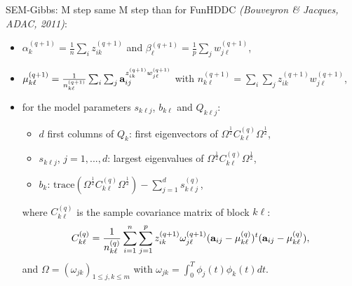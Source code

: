 \documentclass[10pt]{beamer}
\newcommand{\ba}{\bold{a}}
\begin{document}
\begin{frame}{SEM-Gibbs: M step}
same M step than for FunHDDC \textit{(Bouveyron \& Jacques, ADAC, 2011)}:
\begin{itemize}
\item $\alpha_{k}^{(q+1)}=\frac{1}{n}\sum_{i}z_{ik}^{(q+1)}$ and $\beta_{\ell}^{(q+1)}=\frac{1}{p}\sum_{j}w_{j\ell}^{(q+1)}$,
\item $\mu_{k\ell}^{(q+1)}=\frac{1}{n_{k\ell}^{(q+1)}}\sum_{i}\sum_{j}\ba_{ij}^{z_{ik}^{(q+1)}w_{j\ell}^{(q+1)}}$ with $n_{k\ell}^{(q+1)}=\sum_{i}\sum_{j}{z_{ik}^{(q+1)}w_{j\ell}^{(q+1)}}$,
\item for the model parameters $s_{k\ell j}$, $b_{k\ell}$ and $Q_{k\ell j}$:
\begin{itemize}
\item $d$ first columns of $Q_{k}$: first eigenvectors of $\Omega^{\frac{1}{2}}C_{k\ell}^{(q)}\Omega^{\frac{1}{2}}$,
\item $s_{k\ell j}$, $j=1,...,d$: largest eigenvalues of $\Omega^{\frac{1}{2}}C_{k\ell}^{(q)}\Omega^{\frac{1}{2}}$,
\item $b_{k}$: $\mathrm{trace}(\Omega^{\frac{1}{2}}C_{k\ell}^{(q)}\Omega^{\frac{1}{2}})-\sum_{j=1}^{d}s_{k\ell j}^{(q)}$,
\end{itemize}
where $C_{k\ell}^{(q)}$ is the sample covariance matrix of block $k\ell$:
$$C_{k\ell}^{(q)}=\frac{1}{n_{k\ell}^{(q)}}\sum_{i=1}^{n}\sum_{j=1}^{p}z_{ik}^{(q+1)}\omega_{j\ell}^{(q+1)}(\ba_{ij}-\mu_{k\ell}^{(q)})^{t}(\ba_{ij}-\mu_{k\ell}^{(q)}),$$
and $\Omega=(\omega_{jk})_{1\leq j,k\leq m}$ with $\omega_{jk}=\int_0^T\phi_j(t)\phi_k(t)dt$.
\end{itemize}
\end{frame}
\end{document}
